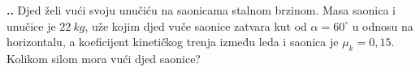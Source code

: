 

\noindent 
\textbf{
\thecjelina.\thezadatak.}
Djed želi vući svoju unučiću na saonicama stalnom brzinom. Masa saonica i unučice je $22\ kg$, uže kojim djed vuče saonice zatvara kut 
od $\alpha=60^\circ$ u odnosu na horizontalu, a koeficijent kinetičkog trenja između leda i saonica je $\mu_k=0,15$. Kolikom silom mora vući djed saonice?

